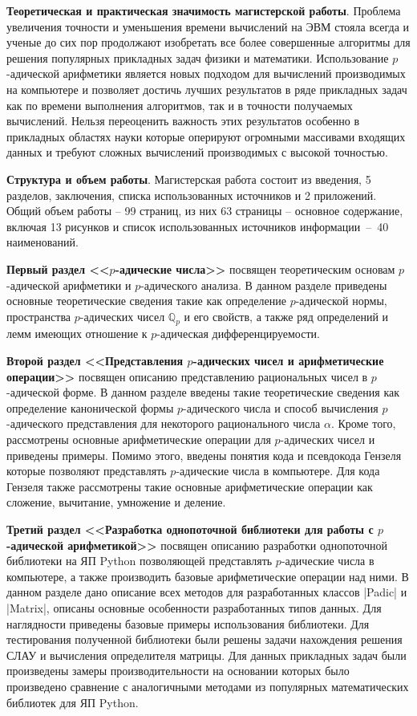 \documentclass[master, och, autoref, times]{sty/SCWorks}
\theoremstyle{plain}
\theoremstyle{definition}
\numberwithin{equation}{section}
\newcommand\summary[1][]{\starsection{КРАТКОЕ СОДЕРЖАНИЕ РАБОТЫ}}
\begin{document}
\textbf{Теоретическая и практическая значимость магистерской работы}. Проблема увеличения точности и уменьшения времени вычислений на ЭВМ стояла всегда и ученые до сих пор продолжают изобретать все более совершенные алгоритмы для решения популярных прикладных задач физики и математики. Использование $p$-адической арифметики является новых подходом для вычислений производимых на компьютере и позволяет достичь лучших результатов в ряде прикладных задач как по времени выполнения алгоритмов, так и в точности получаемых вычислений. Нельзя переоценить важность этих результатов особенно в прикладных областях науки которые оперируют огромными массивами входящих данных и требуют сложных вычислений производимых с высокой точностью.


\textbf{Структура и объем работы}.
Магистерская работа состоит из введения, 5 разделов, заключения, списка использованных источников и 2 приложений. Общий объем работы -- 99 страниц, из них 63 страницы -- основное содержание, включая 13 рисунков и список использованных источников \mbox{информации -- 40} наименований.


\summary 
\textbf{Первый раздел <<$p$-адические числа>>} посвящен теоретическим основам $p$-адической арифметики и $p$-адического анализа. В данном разделе приведены основные теоретические сведения такие как определение $p$-адической нормы, пространства $p$-адических чисел $\mathbb{Q}_p$ и его свойств, а также ряд определений и лемм имеющих отношение к $p$-адическая дифференцируемости.


\textbf{Второй раздел <<Представления $p$-адических чисел и арифметические операции>>} посвящен описанию представлению рациональных чисел в $p$-адической форме. В данном разделе введены такие теоретические сведения как определение канонической формы $p$-адического числа и способ вычисления $p$-адического представления для некоторого рационального числа $\alpha$. Кроме того, рассмотрены основные арифметические операции для $p$-адических чисел и приведены примеры. Помимо этого, введены понятия кода и псевдокода Гензеля которые позволяют представлять $p$-адические числа в компьютере. Для кода Гензеля также рассмотрены такие основные арифметические операции как сложение, вычитание, умножение и деление.

\textbf{Третий раздел <<Разработка однопоточной библиотеки для работы с $p$-адической арифметикой>>} посвящен описанию разработки однопоточной библиотеки на ЯП Python позволяющей представлять $p$-адические числа в компьютере, а также производить базовые арифметические операции над ними. В данном разделе дано описание всех методов для разработанных классов |Padic| и |Matrix|, описаны основные особенности разработанных типов данных. Для наглядности приведены базовые примеры использования библиотеки. Для тестирования полученной библиотеки были решены задачи нахождения решения СЛАУ и вычисления определителя матрицы. Для данных прикладных задач были произведены замеры производительности на основании которых было произведено сравнение с аналогичными методами из популярных математических библиотек для ЯП Python. 
\end{document}
